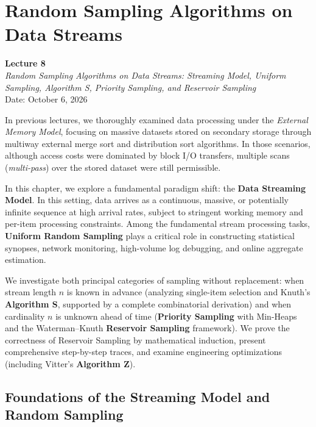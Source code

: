 \chapter{Random Sampling Algorithms on Data Streams}
\label{chap:random-sampling-data-streams}

\begin{center}
  \textbf{Lecture 8}\\
  \emph{Random Sampling Algorithms on Data Streams: Streaming Model, Uniform Sampling, Algorithm S, Priority Sampling, and Reservoir Sampling}\\[0.5em]
  Date: October 6, 2026
\end{center}

In previous lectures, we thoroughly examined data processing under the \textit{External Memory Model}, focusing on massive datasets stored on secondary storage through multiway external merge sort and distribution sort algorithms. In those scenarios, although access costs were dominated by block I/O transfers, multiple scans (\textit{multi-pass}) over the stored dataset were still permissible.

In this chapter, we explore a fundamental paradigm shift: the \textbf{Data Streaming Model}. In this setting, data arrives as a continuous, massive, or potentially infinite sequence at high arrival rates, subject to stringent working memory and per-item processing constraints. Among the fundamental stream processing tasks, \textbf{Uniform Random Sampling} plays a critical role in constructing statistical synopses, network monitoring, high-volume log debugging, and online aggregate estimation.

We investigate both principal categories of sampling without replacement: when stream length $n$ is known in advance (analyzing single-item selection and Knuth's \textbf{Algorithm S}, supported by a complete combinatorial derivation) and when cardinality $n$ is unknown ahead of time (\textbf{Priority Sampling} with Min-Heaps and the Waterman--Knuth \textbf{Reservoir Sampling} framework). We prove the correctness of Reservoir Sampling by mathematical induction, present comprehensive step-by-step traces, and examine engineering optimizations (including Vitter's \textbf{Algorithm Z}).

\FloatBarrier
\section{Foundations of the Streaming Model and Random Sampling}
\label{sec:streaming-model-foundations}

